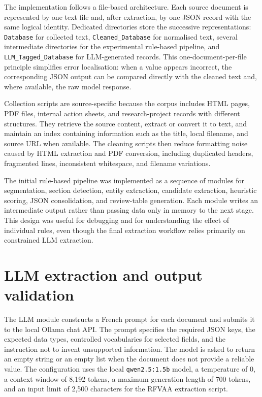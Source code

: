\documentclass[
11pt,
english,
singlespacing,
headsepline,
]{MastersDoctoralThesis}
\begin{document}
The implementation follows a file-based architecture. Each source document is
represented by one text file and, after extraction, by one JSON record with the
same logical identity. Dedicated directories store the successive
representations: \texttt{Database} for collected text, \texttt{Cleaned\_Database}
for normalised text, several intermediate directories for the experimental
rule-based pipeline, and \texttt{LLM\_Tagged\_Database} for LLM-generated
records. This one-document-per-file principle simplifies error localisation:
when a value appears incorrect, the corresponding JSON output can be compared
directly with the cleaned text and, where available, the raw model response.

Collection scripts are source-specific because the corpus includes HTML pages,
PDF files, internal action sheets, and research-project records with different
structures. They retrieve the source content, extract or convert it to text,
and maintain an index containing information such as the title, local filename,
and source URL when available. The cleaning scripts then reduce formatting noise
caused by HTML extraction and PDF conversion, including duplicated headers,
fragmented lines, inconsistent whitespace, and filename variations.

The initial rule-based pipeline was implemented as a sequence of modules for
segmentation, section detection, entity extraction, candidate extraction,
heuristic scoring, JSON consolidation, and review-table generation. Each module
writes an intermediate output rather than passing data only in memory to the
next stage. This design was useful for debugging and for understanding the
effect of individual rules, even though the final extraction workflow relies
primarily on constrained LLM extraction.

\section{LLM extraction and output validation}

The LLM module constructs a French prompt for each document and submits it to
the local Ollama chat API. The prompt specifies the required JSON keys, the
expected data types, controlled vocabularies for selected fields, and the
instruction not to invent unsupported information. The model is asked to return
an empty string or an empty list when the document does not provide a reliable
value. The configuration uses the local \texttt{qwen2.5:1.5b} model, a
temperature of 0, a context window of 8,192 tokens, a maximum generation length
of 700 tokens, and an input limit of 2,500 characters for the RFVAA extraction
script.
\end{document}

